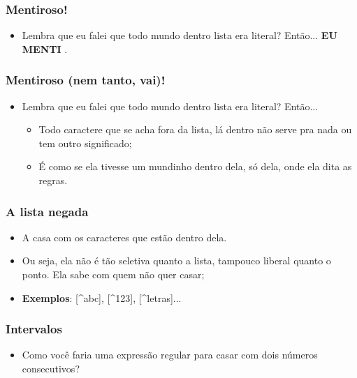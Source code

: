 \begin{frame}
	\frametitle{Mentiroso!}
	\begin{itemize}
		\item Lembra que eu falei que todo mundo dentro lista era literal? Então... \Large{\bf EU MENTI }.
	\end{itemize}
\end{frame}

\begin{frame}
	\frametitle{Mentiroso (nem tanto, vai)!}
	\begin{itemize}
		\item Lembra que eu falei que todo mundo dentro lista era literal? Então...
		\begin{itemize}
			\item Todo caractere que se acha fora da lista, lá dentro não serve pra nada ou tem outro significado;
			\item É como se ela tivesse um mundinho dentro dela, só dela, onde ela dita as regras.
		\end{itemize}
	\end{itemize}
\end{frame}

\begin{frame}
	\frametitle{A lista negada}
	\begin{itemize}
		\item \Large{A  casa com  os caracteres que \textbf{} estão dentro dela.}
		\item Ou seja, ela não é tão seletiva quanto a lista, tampouco liberal quanto o ponto. Ela sabe com quem não quer casar;
		\item \textbf{Exemplos}: [\textasciicircum abc], [\textasciicircum 123], [\textasciicircum letras]...
	\end{itemize}
\end{frame}

\begin{frame}
	\frametitle{Intervalos}
	
	\begin{itemize}
		\item Como você faria uma expressão regular para casar com dois números consecutivos?
	\end{itemize}
\end{frame}

